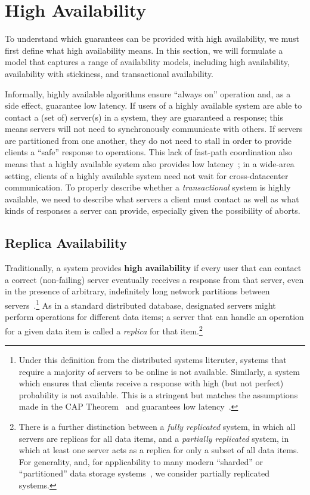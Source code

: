 
\section{High Availability}
\label{sec:availability}

To understand which guarantees can be provided with high availability,
we must first define what high availability means. In this section, we
will formulate a model that captures a range of availability models,
including high availability, availability with stickiness, and
transactional availability.

Informally, highly available algorithms ensure ``always on'' operation
and, as a side effect, guarantee low latency. If users of a highly
available system are able to contact a (set of) server(s) in a system,
they are guaranteed a response; this means servers will not need to
synchronously communicate with others. If servers are partitioned from one
another, they do not need to stall in order to provide clients a
``safe'' response to operations. This lack of fast-path coordination
also means that a highly available system also provides low
latency~\cite{abadi-pacelc}; in a wide-area setting, clients of a
highly available system need not wait for cross-datacenter
communication. To properly describe whether a \textit{transactional}
system is highly available, we need to describe what servers a client
must contact as well as what kinds of responses a server can provide,
especially given the possibility of aborts.

\subsection{Replica Availability}

Traditionally, a system provides {\textbf{high availability}} if every
user that can contact a correct (non-failing) server eventually
receives a response from that server, even in the presence of
arbitrary, indefinitely long network partitions between
servers~\cite{gilbert-cap}.\footnote{Under this definition from the
  distributed systems literuter, systems that require a majority of
  servers to be online is not available. Similarly, a system which
  ensures that clients receive a response with high (but not perfect)
  probability is not available. This is a stringent but matches the
  assumptions made in the CAP Theorem~\cite{gilbert-cap} and
  guarantees low latency~\cite{abadi-pacelc}.} As in a standard
distributed database, designated servers might perform operations for
different data items; a server that can handle an operation for a
given data item is called a \textit{replica} for that
item.\footnote{There is a further distinction between a \textit{fully
    replicated} system, in which all servers are replicas for all data
  items, and a \textit{partially replicated} system, in which at least
  one server acts as a replica for only a subset of all data
  items. For generality, and, for applicability to many modern
  ``sharded'' or ``partitioned'' data storage systems~\cite{ bigtable,
    pnuts, spanner, dynamo, hstore}, we consider partially replicated
  systems.}

